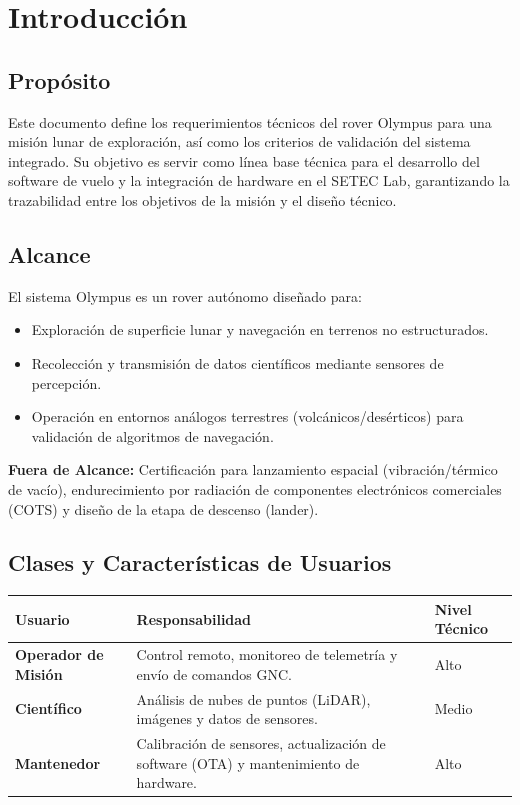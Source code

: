 \section{Introducción}

\subsection{Propósito}
Este documento define los requerimientos técnicos del rover Olympus para una misión lunar de exploración, así como los criterios de validación del sistema integrado. Su objetivo es servir como línea base técnica para el desarrollo del software de vuelo y la integración de hardware en el SETEC Lab, garantizando la trazabilidad entre los objetivos de la misión y el diseño técnico.

\subsection{Alcance}
El sistema Olympus es un rover autónomo diseñado para:
\begin{itemize}
    \item Exploración de superficie lunar y navegación en terrenos no estructurados.
    \item Recolección y transmisión de datos científicos mediante sensores de percepción.
    \item Operación en entornos análogos terrestres (volcánicos/desérticos) para validación de algoritmos de navegación.
\end{itemize}
\textbf{Fuera de Alcance:} Certificación para lanzamiento espacial (vibración/térmico de vacío), endurecimiento por radiación de componentes electrónicos comerciales (COTS) y diseño de la etapa de descenso (lander).

\subsection{Clases y Características de Usuarios}
\begin{table}[H]
    \centering
    \begin{tabularx}{\textwidth}{|l|X|l|}
        \hline
        \rowcolor{AgencyBlue!10} \textbf{Usuario} & \textbf{Responsabilidad} & \textbf{Nivel Técnico} \\ \hline
        \textbf{Operador de Misión} & Control remoto, monitoreo de telemetría y envío de comandos GNC. & Alto \\ \hline
        \textbf{Científico} & Análisis de nubes de puntos (LiDAR), imágenes y datos de sensores. & Medio \\ \hline
        \textbf{Mantenedor} & Calibración de sensores, actualización de software (OTA) y mantenimiento de hardware. & Alto \\ \hline
    \end{tabularx}
\end{table}

